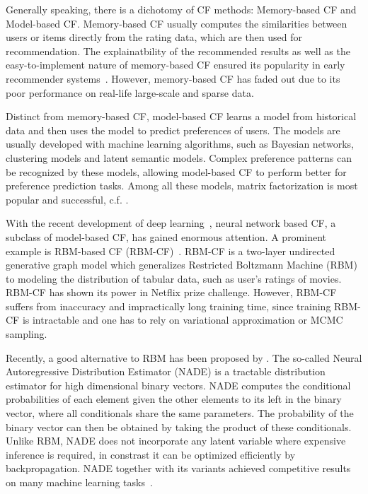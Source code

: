 \documentclass{article}
\begin{document}
Generally speaking, there is a dichotomy of CF methods: Memory-based CF and Model-based CF. Memory-based CF usually computes the similarities between users or items directly from the rating data, which are then used for recommendation.  The explainatbility of the recommended results as well as the easy-to-implement nature of memory-based CF ensured its popularity in early recommender
  systems~\citep{resnick1994grouplens}. However, memory-based CF has
  faded out due to its poor performance on real-life large-scale and sparse data. 


Distinct from memory-based CF, model-based CF learns
  a model from historical data and then uses the model to predict
  preferences of users. The models are usually developed with machine
  learning algorithms, such as Bayesian networks, clustering models
  and latent semantic models. Complex preference patterns can be
  recognized by these models, allowing model-based CF to perform better for
   preference prediction tasks.  Among all these models,
  matrix factorization is most popular and successful, c.f.
  \citep{koren2009matrix,salakhutdinov2008bayesian,mackey2011divide,gopalan2013scalable}.



  With the recent development of deep
  learning~\citep{krizhevsky2012imagenet,szegedy2014going,he2015deep},
  neural network based CF, a subclass of model-based CF, has gained
  enormous attention. A prominent example is RBM-based CF
  (RBM-CF)~\citep{salakhutdinov2007restricted}. RBM-CF is a two-layer
  undirected generative graph model which generalizes Restricted
  Boltzmann Machine (RBM) to modeling the distribution of tabular
  data, such as user's ratings of movies. RBM-CF has shown its power
  in Netflix prize challenge. However, RBM-CF suffers from inaccuracy
  and impractically long training time, since training RBM-CF is
  intractable and one has to rely on variational approximation
  or MCMC sampling.



  Recently, a good alternative to RBM has been proposed by
  \citet{larochelle2011neural}. The so-called Neural Autoregressive
  Distribution Estimator (NADE) is a tractable distribution estimator
  for high dimensional binary vectors. NADE computes the conditional
  probabilities of each element given the other elements to its left
  in the binary vector, where all conditionals share the same
  parameters. The probability of the binary vector can then be
  obtained by taking the product of these conditionals. Unlike RBM,
  NADE does not incorporate any latent variable where expensive
  inference is required, in constrast it can be optimized efficiently
  by backpropagation. NADE together with its variants achieved
  competitive results on many machine learning
  tasks~\citep{larochelle2012neural,uria2013rnade,zheng14sup,Uria2013b,zheng2014neural,zheng15deep}.
\end{document}
